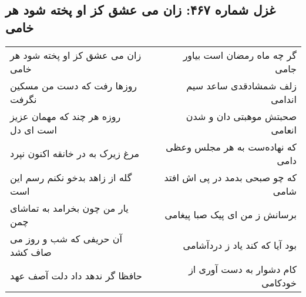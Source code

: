 \begin{center}
\section*{غزل شماره ۴۶۷: زان می عشق کز او پخته شود هر خامی}
\label{sec:sh467}
\begin{longtable}{l p{0.5cm} r}
زان می عشق کز او پخته شود هر خامی
&&
گر چه ماه رمضان است بیاور جامی
\\
روزها رفت که دست من مسکین نگرفت
&&
زلف شمشادقدی ساعد سیم اندامی
\\
روزه هر چند که مهمان عزیز است ای دل
&&
صحبتش موهبتی دان و شدن انعامی
\\
مرغ زیرک به در خانقه اکنون نپرد
&&
که نهاده‌ست به هر مجلس وعظی دامی
\\
گله از زاهد بدخو نکنم رسم این است
&&
که چو صبحی بدمد در پی اش افتد شامی
\\
یار من چون بخرامد به تماشای چمن
&&
برسانش ز من ای پیک صبا پیغامی
\\
آن حریفی که شب و روز می صاف کشد
&&
بود آیا که کند یاد ز دردآشامی
\\
حافظا گر ندهد داد دلت آصف عهد
&&
کام دشوار به دست آوری از خودکامی
\\
\end{longtable}
\end{center}

